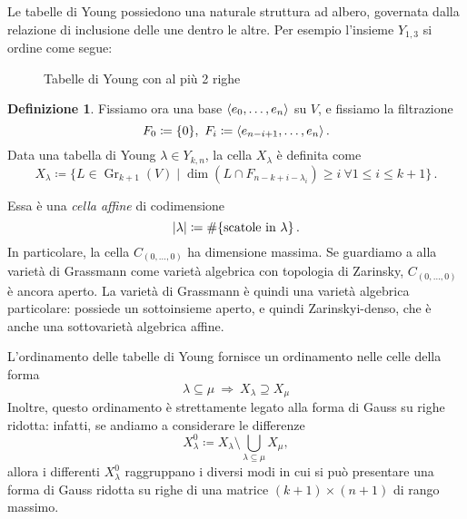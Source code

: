 \documentclass[a4paper, 11pt]{article}
\theoremstyle{definition}
\newtheorem{Def}{Definizione}[section]
\theoremstyle{plain}
\DeclarePairedDelimiter{\ang}{\langle}{\rangle}
\DeclarePairedDelimiter{\abs}{\lvert}{\rvert}
\newcommand{\deff}{\coloneqq}
\DeclareMathOperator{\Gr}{Gr}
\begin{document}
Le tabelle di Young possiedono una naturale struttura ad albero, governata dalla relazione di inclusione delle une dentro le altre. Per esempio l'insieme $Y_{1,3}$ si ordine come segue:\vspace{0.3cm}
\begin{figure}[h]
\centering
{}
\caption{Tabelle di Young con al più 2 righe}
\label{fig:young2}
\end{figure}
\begin{Def}
Fissiamo ora una base $\ang{e_0, \dots, e_n}$ su $V$, e fissiamo la filtrazione
\[
	F_0 \deff \{0\},\ F_i \deff \ang{e_{n-i+1}, \dots, e_n}\,.
\] 
Data una tabella di Young $\lambda \in Y_{k,n}$, la cella $X_\lambda$ è definita come
\[
	X_\lambda \deff \{L \in \Gr_{k+1}(V) \mid \dim(L \cap F_{n-k+i-\lambda_i}) \ge i\ \forall 1 \le i \le k+1\}\,.
\]
\end{Def}
Essa è una \emph{cella affine} di codimensione 
\[
	\abs{\lambda} \deff \#\{\text{scatole in }\lambda\}\,.
\]
In particolare, la cella $C_{(0,\dots, 0)}$ ha dimensione massima. Se guardiamo a alla varietà di Grassmann come varietà algebrica con topologia di Zarinsky, $C_{(0,\dots, 0)}$ è ancora aperto. La varietà di Grassmann è quindi una varietà algebrica particolare: possiede un sottoinsieme aperto, e quindi Zarinskyi-denso, che è anche una sottovarietà algebrica affine.

L'ordinamento delle tabelle di Young fornisce un ordinamento nelle celle della forma
\[
	\lambda \subseteq \mu \ \Rightarrow\ X_\lambda \supseteq X_\mu
\]
Inoltre, questo ordinamento è strettamente legato alla forma di Gauss su righe ridotta: infatti, se andiamo a considerare le differenze
\[
	X_\lambda^0 \deff X_\lambda \setminus \bigcup_{\lambda \subseteq \mu} X_\mu,
\]
allora i differenti $X_\lambda^0$ raggruppano i diversi modi in cui si può presentare una forma di Gauss ridotta su righe di una matrice $(k+1)\times(n+1)$ di rango massimo. 
\end{document}
